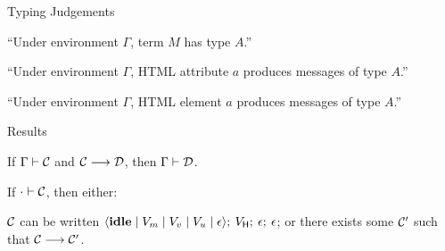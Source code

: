 \documentclass[11.5pt, aspectratio=169]{beamer}
\begin{document}
\begin{frame}{Typing Judgements}

  \begin{center}
  {\Huge {}}
  \vspace{0.5em}

    ``Under environment $\Gamma$, term $M$ has type $A$.''
  \end{center}
  \vspace{1em}

  \begin{center}
  {\Huge {}}
  \vspace{0.5em}

    ``Under environment $\Gamma$, HTML attribute $a$ produces messages of type $A$.''
  \end{center}
  \vspace{1em}

  \begin{center}
  {\Huge {}}
  \vspace{0.5em}

    ``Under environment $\Gamma$, HTML element $a$ produces messages of type $A$.''
  \end{center}
\end{frame}

\begin{frame}{Results}

  {\large
\begin{theorem}
  \label{thm:config-pres}
  If $\Gamma \vdash \mathcal{C}$ and $\mathcal{C} \longrightarrow \mathcal{D}$, then $\Gamma \vdash \mathcal{D}$.
\end{theorem}
%
\vspace{2em}
%
  \begin{theorem}\label{thm:event-progress}
    If $\cdot \vdash \mathcal{C}$, then either:
    \begin{itemize}
      \itemR $\mathcal{C}$ can be written $\langle \mathbf{\mathbf{idle}} \mid V_m \mid V_v \mid V_u \mid \epsilon \rangle ;\: V_{\textsf{H}} ;\: \epsilon ;\: \epsilon$; or
      \itemR there exists some $\mathcal{C}'$ such that $\mathcal{C} \longrightarrow \mathcal{C'}$.
      \end{itemize}
  \end{theorem}
}
\end{frame}


\end{document}
